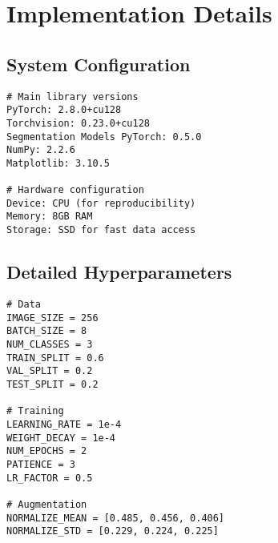 \documentclass[12pt,a4paper]{article}
\begin{document}
\section{Implementation Details}

\subsection{System Configuration}

\begin{lstlisting}[caption=Experimental environment configuration]
# Main library versions
PyTorch: 2.8.0+cu128
Torchvision: 0.23.0+cu128
Segmentation Models PyTorch: 0.5.0
NumPy: 2.2.6
Matplotlib: 3.10.5

# Hardware configuration
Device: CPU (for reproducibility)
Memory: 8GB RAM
Storage: SSD for fast data access
\end{lstlisting}

\subsection{Detailed Hyperparameters}

\begin{lstlisting}[caption=Complete hyperparameter configuration]
# Data
IMAGE_SIZE = 256
BATCH_SIZE = 8
NUM_CLASSES = 3
TRAIN_SPLIT = 0.6
VAL_SPLIT = 0.2
TEST_SPLIT = 0.2

# Training
LEARNING_RATE = 1e-4
WEIGHT_DECAY = 1e-4
NUM_EPOCHS = 2
PATIENCE = 3
LR_FACTOR = 0.5

# Augmentation
NORMALIZE_MEAN = [0.485, 0.456, 0.406]
NORMALIZE_STD = [0.229, 0.224, 0.225]
\end{lstlisting}
\end{document}
